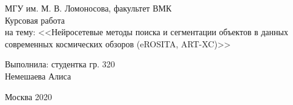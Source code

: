 \begin{center} 

\large МГУ им. М. В. Ломоносова, факультет ВМК\\[5.5cm] 

\huge Курсовая работа \\[0.6cm] %
\large на тему:  <<Нейросетевые методы поиска и сегментации объектов в данных современных 
космических обзоров (eROSITA, ART-XC)>>\\[3.7cm]


\end{center} 

\begin{flushright}
Выполнила: студентка гр. 320 \\
Немешаева Алиса \\
\end{flushright}


\vfill 

\begin{center} 
\large Москва 2020
\end{center} 

\thispagestyle{empty}
